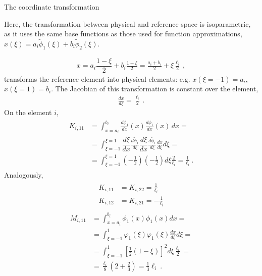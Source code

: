 \documentclass[letterpaper,10pt,english]{jupyterBook}
\begin{document}
\sphinxAtStartPar
{} The coordinate transformation%
\begin{footnote}[2]\sphinxAtStartFootnote
Here, the transformation between physical and reference space is iso\sphinxhyphen{}parametric, as it uses the same base functions as those used for function approximations, \(x(\xi) = a_i \widetilde{\phi}_1(\xi) + b_i \widetilde{\phi}_2(\xi)\).
%
\end{footnote}
\begin{equation*}
\begin{split}x = a_i \dfrac{1 - \xi}{2} + b_i \frac{1+\xi}{2} = \frac{a_i + b_i}{2} + \xi \frac{\ell_i}{2} \ ,\end{split}
\end{equation*}
\sphinxAtStartPar
transforms the reference element into physical elements: e.g. \(x(\xi=-1) = a_i\), \(x(\xi=1) = b_i\). The Jacobian of this transformation is constant over the element,
\begin{equation*}
\begin{split}\frac{d x}{d \xi} = \frac{\ell_i}{2} \ .\end{split}
\end{equation*}
\sphinxAtStartPar
On the element \(i\),
\begin{equation*}
\begin{split}\begin{aligned}
  K_{i, 11} 
  & = \int_{x=a_i}^{b_i} \frac{d\phi_1}{dx}(x) \frac{d\phi_1}{dx}(x) \, dx = \\
  & = \int_{\xi=-1}^{\xi=1} \dfrac{d \xi}{d x} \frac{d \widetilde{\phi}_1}{d \xi} \dfrac{d \xi}{d x} \frac{d \widetilde{\phi}_1}{d \xi} \frac{dx}{d \xi} d \xi = \\
  & = \int_{\xi=-1}^{\xi=1} \left(-\frac{1}{2}\right)\left(-\frac{1}{2}\right) d \xi \frac{2}{\ell_i}
    = \frac{1}{\ell_i} \ .
\end{aligned}\end{split}
\end{equation*}
\sphinxAtStartPar
Analogously,
\begin{equation*}
\begin{split}\begin{aligned}
  K_{i, 11} & = K_{i, 22} =   \frac{1}{\ell_i} \\
  K_{i, 12} & = K_{i, 21} = - \frac{1}{\ell_i}
\end{aligned}\end{split}
\end{equation*}\begin{equation*}
\begin{split}\begin{aligned}
  M_{i,11} 
  & = \int_{x=a_i}^{b_i} \phi_1(x) \phi_1(x) dx = \\
  & = \int_{\xi=-1}^{1} \varphi_1(\xi) \varphi_1(\xi) \frac{dx}{d \xi} d \xi = \\
  & = \int_{\xi=-1}^{1} \left[ \frac{1}{2} \left( 1 - \xi \right) \right]^2 d \xi \frac{\ell_i}{2} = \\
  & = \frac{\ell_i}{8} \left( 2 + \frac{2}{3} \right) = \frac{1}{3}\ell_i \ .
\end{aligned}\end{split}
\end{equation*}
\end{document}
